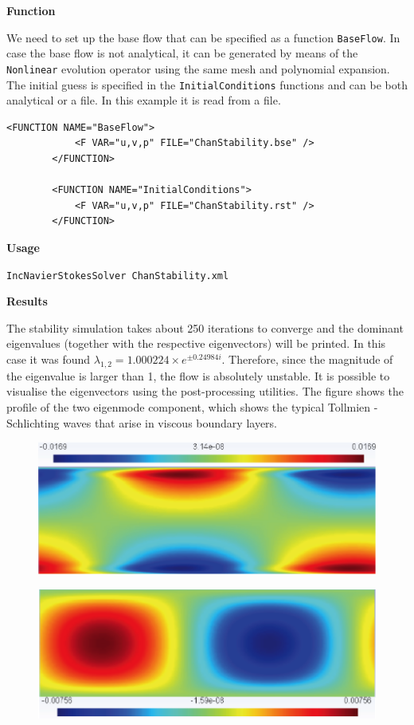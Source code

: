 \textbf{Function}

We need to set up the base flow that can be specified as a function \texttt{BaseFlow}. In case the base flow is not analytical, it can be generated by means of the \texttt{Nonlinear} evolution operator using the same mesh and polynomial expansion. The initial guess is specified in the \texttt{InitialConditions} functions and can be both analytical or a file. In this example it is read from a file. 

    \begin{lstlisting}[style=XMLStyle]
<FUNCTION NAME="BaseFlow">
            <F VAR="u,v,p" FILE="ChanStability.bse" />
        </FUNCTION>

        <FUNCTION NAME="InitialConditions">
            <F VAR="u,v,p" FILE="ChanStability.rst" />
        </FUNCTION>
                         \end{lstlisting}



\textbf{Usage}

\texttt{IncNavierStokesSolver ChanStability.xml}


\textbf{Results}

The stability simulation takes about 250 iterations to converge and the dominant eigenvalues (together with the respective eigenvectors) will be printed. In this case it was found $    \lambda_{1,2}=1.000224 \times e^{\pm 0.24984i}$. Therefore, since the magnitude of the eigenvalue is larger than 1, the flow is absolutely unstable. It is possible to visualise the eigenvectors using the post-processing utilities. The figure shows the profile of the two eigenmode component, which shows the typical Tollmien - Schlichting waves that arise in viscous boundary layers.

\begin{figure}[!htbp]
\centering
 {\includegraphics[width=1 \textwidth]{Figures/chan_u.png}}
   \caption {}
\end{figure}

\begin{figure}[!htbp]
\centering
 {\includegraphics[width=1 \textwidth]{Figures/chan_v}}
    \caption {}
\end{figure}

